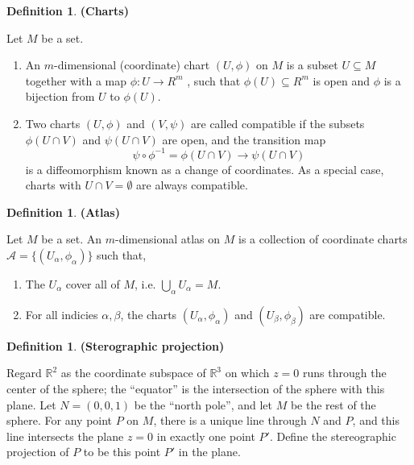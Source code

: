\documentclass{article}
\theoremstyle{definition}
\newtheorem{defn}[theorem]{Definition}
\newenvironment{definition}
  {\vspace{8pt}\begin{mdframed}[backgroundcolor=blueish]\begin{defn}}
  {\end{defn}\end{mdframed}\vspace{4pt}}
\begin{document}
\begin{definition} \textbf{(Charts)}

Let $M$ be a set.
\begin{enumerate}
    \item An $m$-dimensional (coordinate) chart $(U,\phi)$ on $M$ is a subset $U \subseteq M$ together with a map $\phi : U \rightarrow R^m$ , such that $\phi(U) \subseteq R^m$ is open and $\phi$ is a bijection from $U$ to $\phi(U)$.
    
    \item  Two charts $(U,\phi)$ and $(V,\psi)$ are called compatible if the subsets $\phi(U \cap V)$ and $\psi(U \cap V)$ are open, and the transition map
    \[
        \psi \circ \phi^{-1}  = \phi(U \cap V) \rightarrow \psi(U \cap V)
    \]
    is a diffeomorphism known as a change of coordinates. As a special case, charts with $U\cap V = \emptyset $ are always compatible.
\end{enumerate}
\end{definition}

\begin{definition} \textbf{(Atlas)}

Let $M$ be a set. An $m$-dimensional atlas on $M$ is a collection of coordinate charts $\mathscr{A} =  \{(U_\alpha, \phi_\alpha) \}$ such that,
\begin{enumerate}
    \item The $U_\alpha$ cover all of $M$, i.e. $\bigcup_\alpha U_\alpha = M$.
    \item For all indicies $\alpha, \beta$, the charts $(U_\alpha, \phi_\alpha)$ and $(U_\beta, \phi_\beta)$ are compatible.
\end{enumerate}

\end{definition}

\begin{definition} \textbf{(Sterographic projection)}

Regard $\mathbb R^2$ as the coordinate subspace of $\mathbb R^3$ on which $z = 0$ runs through the center of the sphere; the ``equator'' is the intersection of the sphere with this plane.
Let $N = (0, 0, 1)$ be the ``north pole'', and let $M$ be the rest of the sphere. For any point $P$ on $M$, there is a unique line through $N$ and $P$, and this line intersects the plane $z = 0$ in exactly one point $P'$. Define the stereographic projection of $P$ to be this point $P'$ in the plane. 
\end{definition}
\end{document}
